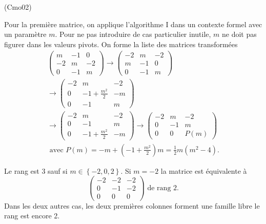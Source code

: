 \begin{tiny}(Cmo02)\end{tiny} Pour la première matrice, on applique l'algorithme I dans un contexte formel avec un paramètre $m$.
Pour ne pas introduire de cas particulier inutile, $m$ ne doit pas figurer dans les valeurs pivots. On forme la liste des matrices transformées
\begin{multline*}
  \begin{pmatrix}
    m & -1 & 0 \\
    -2 & m & -2 \\
    0 & -1 & m
  \end{pmatrix}
\rightarrow
  \begin{pmatrix}
    -2 & m & -2 \\
    m & -1 & 0 \\
    0 & -1 & m
  \end{pmatrix} \\
\rightarrow
  \begin{pmatrix}
    -2 & m & -2 \\
    0 & -1 + \frac{m^2}{2} & -m \\
    0 & -1 & m
  \end{pmatrix} \\
\rightarrow
  \begin{pmatrix}
    -2 & m & -2 \\
    0 & -1 & m\\
    0 & -1 + \frac{m^2}{2} & -m 
  \end{pmatrix}
\rightarrow
  \begin{pmatrix}
    -2 & m & -2 \\
    0 & -1 & m\\
    0 & 0 & P(m) 
  \end{pmatrix} \\
\text{ avec }
P(m) = -m + \left( -1 + \frac{m^2}{2}\right)m
= \frac{1}{2}m(m^2 - 4).
\end{multline*}

Le rang est 3 sauf si $m\in \left\lbrace -2, 0, 2\right\rbrace$.\newline
Si $m = -2$ la matrice est équivalente à
\[
  \begin{pmatrix}
    -2 & -2 & -2 \\
    0 & -1 & -2\\
    0 & 0 & 0 
  \end{pmatrix}
  \text{ de rang 2.}
\]
Dans les deux autres cas, les deux premières colonnes forment une famille libre le rang est encore 2.

